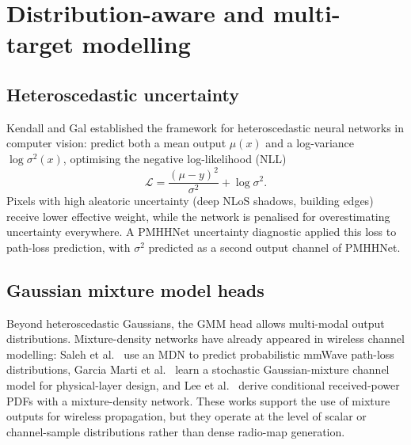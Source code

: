 \section{Distribution-aware and multi-target modelling}
\label{sec:soa_distribution}

\subsection{Heteroscedastic uncertainty}

Kendall and Gal \cite{kendall2017uncertainties} established the framework for
heteroscedastic neural networks in computer vision: predict both a mean output
$\mu(x)$ and a log-variance $\log \sigma^2(x)$, optimising the negative
log-likelihood (NLL)
\begin{equation}
  \mathcal{L} = \frac{(\mu - y)^2}{\sigma^2} + \log \sigma^2.
\end{equation}
Pixels with high aleatoric uncertainty (deep NLoS shadows, building edges)
receive lower effective weight, while the network is penalised for
overestimating uncertainty everywhere. A PMHHNet uncertainty diagnostic applied this
loss to path-loss prediction, with $\sigma^2$ predicted as a second output
channel of PMHHNet.

\subsection{Gaussian mixture model heads}

Beyond heteroscedastic Gaussians, the GMM head allows multi-modal output
distributions.  Mixture-density networks have already appeared in wireless
channel modelling: Saleh et al.\ \cite{saleh2021probabilistic} use an MDN to
predict probabilistic mmWave path-loss distributions, Garcia Marti et al.\
\cite{garciamarti2020mixture} learn a stochastic Gaussian-mixture channel
model for physical-layer design, and Lee et al.\ \cite{lee2024timevarying}
derive conditional received-power PDFs with a mixture-density network.  These
works support the use of mixture outputs for wireless propagation, but they
operate at the level of scalar or channel-sample distributions rather than
dense radio-map generation.

